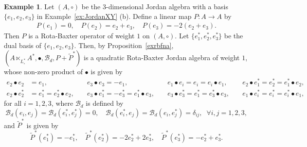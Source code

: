 \documentclass[12pt, reqno, a4paper]{amsart}
\theoremstyle{definition}
\newtheorem{example}[theorem]{Example}
\begin{document}
\begin{example}\label{RBJordan2}
	Let $(A, \circ)$ be the 3-dimensional Jordan algebra with a basis $\{e_{1}, e_{2}, e_{3}\}$ in Example~\ref{ex:JordanXY} (b). 
	Define a linear map $P: A \to A$ by
	\begin{align*}
		P(e_1) = 0, \quad P(e_2) = e_2+ e_3, \quad P(e_3) = -2(e_2+ e_3).
	\end{align*}
	Then $P$ is a Rota-Baxter operator of weight $1$ on $(A, \circ)$.
	Let $\{e_1^*, e_2^*, e_3^*\}$ be the dual basis of $\{e_1, e_2, e_3\}$.
	Then, by Proposition~\ref{exrbfna}, $(A \ltimes_{L_{\circ}^{*}} A^{*}, \bullet, \mathcal{B}_d, P+\tilde{P}^{*})$ is a quadratic Rota-Baxter Jordan algebra of weight $1$, whose
	non-zero product of $\bullet$ is given by
	\begin{align*}
		e_{2} \bullet e_{2} &= e_{1}, \; 
		&&
		e_{3} \bullet e_{3} = -e_{1}, \;
		&&
		e_{1} \bullet e_{i} = e_{i} = e_{i} \bullet e_{1}, \;
		&& e_2 \bullet e_1^* = e_2^* = e_1^* \bullet e_2,  \\
		e_2 \bullet e_2^* &= e_1^* = e_2^* \bullet e_2, \;
		&& e_3 \bullet e_1^* = -e_3^* = e_1^* \bullet e_3, \;
		&& e_3 \bullet e_3^* = e_1^* = e_3^* \bullet e_3, \;
		&& e_1 \bullet e_i^* = e_i^* = e_i^* \bullet e_1,
	\end{align*}
	for all $i=1,2,3$, where $\mathcal{B}_d$ is defined by
	\begin{equation*}
		\mathcal{B}_d(e_i, e_j) = \mathcal{B}_d(e_i^*, e_j^*) = 0, \quad \mathcal{B}_d(e_i^*, e_j) = \mathcal{B}_d(e_i, e_j^*) = \delta_{ij}, \;\; \forall i, j=1, 2, 3,
	\end{equation*}
	and $\tilde{P}^{*}$ is given by 
	\begin{equation*}
		\tilde{P}^{*}(e_1^{*}) = - e_1^{*}, \quad \tilde{P}^{*}(e_2^{*}) = -2e_2^{*}+ 2e_3^{*}, \quad \tilde{P}^{*}(e_3^{*}) = - e_2^{*} + e_3^{*}.
	\end{equation*}
\end{example}
\end{document}
